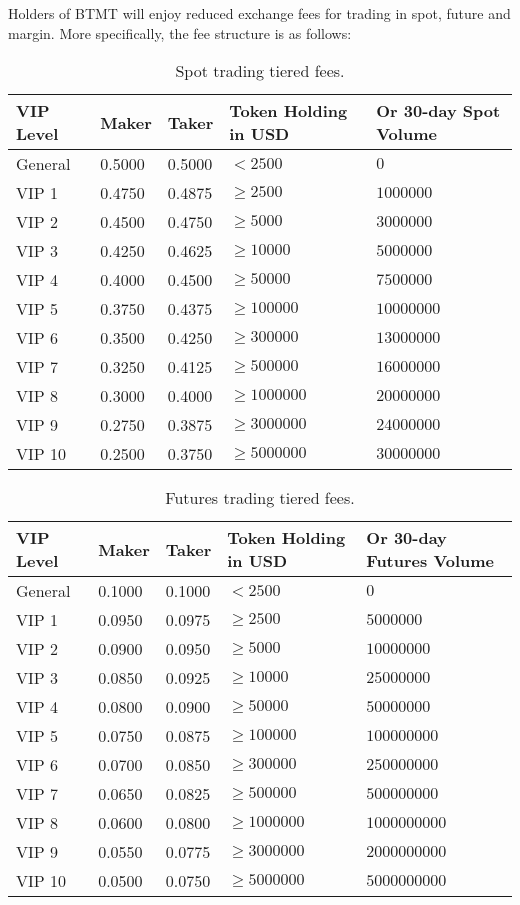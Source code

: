 \documentclass[a4paper,12pt]{article}
\begin{document}
Holders of BTMT will enjoy reduced exchange fees for trading
in spot, future and margin. More specifically, the fee structure is as follows:
\begin{center}
\begin{table}[h]
\begin{tabular}{ |p{2.3cm}||p{2.3cm}|p{2.3cm}|p{2.3cm}|p{2.3cm}| }
\hline
VIP Level & Maker & Taker & Token Holding in USD & Or 30-day Spot Volume \\
\hline
General & 0.5000 & 0.5000 & $< 2500$ & $0$ \\
VIP 1 & 0.4750 & 0.4875 & $\geq 2500$ & $1000000$ \\
VIP 2 & 0.4500 & 0.4750 & $\geq 5000$ & $3000000$ \\
VIP 3 & 0.4250 & 0.4625 & $\geq 10000$ & $5000000$ \\
VIP 4 & 0.4000 & 0.4500 & $\geq 50000$ & $7500000$ \\
VIP 5 & 0.3750 & 0.4375 & $\geq 100000$ & $10000000$ \\
VIP 6 & 0.3500 & 0.4250 & $\geq 300000$ & $13000000$ \\
VIP 7 & 0.3250 & 0.4125 & $\geq 500000$ & $16000000$ \\
VIP 8 & 0.3000 & 0.4000 & $\geq 1000000$ & $20000000$ \\
VIP 9 & 0.2750 & 0.3875 & $\geq 3000000$ & $24000000$ \\
VIP 10 & 0.2500 & 0.3750 & $\geq 5000000$ & $30000000$ \\
\hline
\end{tabular}
  \caption{Spot trading tiered fees.}
\end{table}

\begin{table}
\begin{tabular}{ |p{2.3cm}||p{2.3cm}|p{2.3cm}|p{2.3cm}|p{2.3cm}| }
\hline
VIP Level & Maker & Taker & Token Holding in USD & Or 30-day Futures Volume \\
\hline
General & 0.1000 & 0.1000 & $< 2500$ & $0$ \\
VIP 1 & 0.0950 & 0.0975 & $\geq 2500$ & $5000000$ \\
VIP 2 & 0.0900 & 0.0950 & $\geq 5000$ & $10000000$ \\
VIP 3 & 0.0850 & 0.0925 & $\geq 10000$ & $25000000$ \\
VIP 4 & 0.0800 & 0.0900 & $\geq 50000$ & $50000000$ \\
VIP 5 & 0.0750 & 0.0875 & $\geq 100000$ & $100000000$ \\
VIP 6 & 0.0700 & 0.0850 & $\geq 300000$ & $250000000$ \\
VIP 7 & 0.0650 & 0.0825 & $\geq 500000$ & $500000000$ \\
VIP 8 & 0.0600 & 0.0800 & $\geq 1000000$ & $1000000000$ \\
VIP 9 & 0.0550 & 0.0775 & $\geq 3000000$ & $2000000000$ \\
VIP 10 & 0.0500 & 0.0750 & $\geq 5000000$ & $5000000000$ \\
\hline
\end{tabular}
  \caption{Futures trading tiered fees.}
\end{table}


\end{center}
\end{document}

